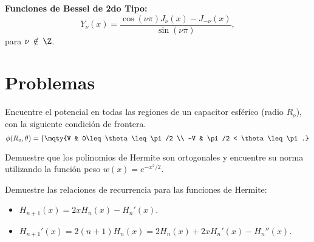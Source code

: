 \begin{mdframed}[style=warning]
	{\Large \textbf{Funciones de Bessel de 2do Tipo:}} \\
		$$ Y_\nu (x) = \frac{\cos{(\nu \pi)} J_\nu (x) - J_{-\nu} (x)}{\sin{(\nu \pi)}}, $$
	para $\nu \, \notin \, \Z$.	
\end{mdframed}






\pagebreak


\section*{Problemas}


\begin{ejercicio}
	Encuentre el potencial en todas las regiones de un capacitor esférico (radio $R_o$), con la siguiente condición de frontera.
		$$ \phi (R_o ,\theta) = \left\{ \mqty{V & 0\leq \theta \leq \pi /2 \\ -V & \pi/2 < \theta \leq \pi.} \right. $$
\end{ejercicio}












\begin{ejercicio}
	Demuestre que los polinomios de Hermite son ortogonales y encuentre su norma utilizando la función peso $w(x) = e^{-x^2 /2}$.
\end{ejercicio}














\begin{ejercicio}
	Demuestre las relaciones de recurrencia para las funciones de Hermite:
	\begin{itemize}
		\item $H_{n + 1} (x) = 2xH_n (x) - H_n ' (x)$.
		\item $H_{n + 1} ' (x) = 2(n + 1) H_n (x) = 2H_n (x) + 2xH_n ' (x) - H_n '' (x)$.
	\end{itemize}
\end{ejercicio}













